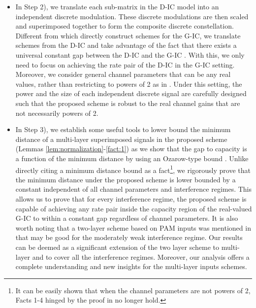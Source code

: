 \documentclass[12pt, draftclsnofoot, onecolumn]{IEEEtran}
\theoremstyle{definition}
\begin{document}
\begin{itemize}
\begin{itemize}
\item In Step 2), we translate each sub-matrix in the D-IC model into an independent discrete modulation. These discrete modulations are then scaled and superimposed together to form the composite discrete constellation. Different from \cite{7451210} which directly construct schemes for the G-IC, we translate schemes from the D-IC and take advantage of the fact that there exists a universal constant gap between the D-IC and the G-IC \cite{doi:10.1002/ett.1287}. With this, we only need to focus on achieving the rate pair of the D-IC in the G-IC setting. Moreover, we consider general channel parameters that can be any real values, rather than restricting to
    powers of 2 as in \cite{ShuoLithesis}. Under this setting, the power and the size of each independent discrete signal are carefully designed such that the proposed scheme is robust to the real channel gains that are not necessarily powers of 2.








\item In Step 3), we establish some useful tools to lower bound the minimum distance of a multi-layer superimposed signals in the proposed scheme (Lemmas \ref{lem:normalization}-\ref{fact:1}) as we show that the gap to capacity is a function of the minimum distance by using an Ozarow-type bound \cite{ozarow90}. Unlike \cite{ShuoLithesis} directly citing a minimum distance bound as a fact\footnote{It can be easily shown that when the channel parameters are not powers of 2, Facts 1-4 hinged by the proof in \cite{ShuoLithesis} no longer hold.}, we rigorously prove that the minimum distance under the proposed scheme is lower bounded by a constant independent of all channel parameters and interference regimes. This allows us to prove that for every interference regime, the proposed scheme is capable of achieving any rate pair inside the capacity region of the real-valued G-IC to within a constant gap regardless of channel parameters. It is also worth noting that a two-layer scheme based on PAM inputs was mentioned in \cite[Sec. VIII-C]{7451210} that may be good for the moderately weak interference regime. Our results can be deemed as a significant extension of the two layer scheme to multi-layer and to cover all the interference regimes. Moreover, our analysis offers a complete understanding and new insights for the multi-layer inputs schemes.

\end{itemize}


\end{itemize}
\end{document}
